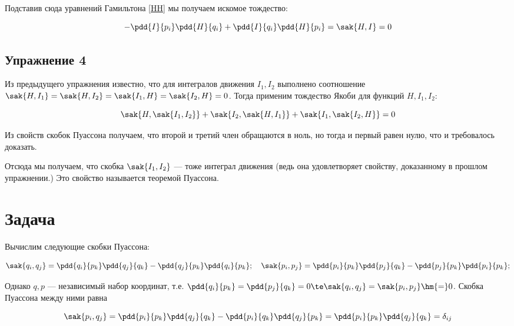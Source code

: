 \documentclass[12pt]{kiarticle}
\begin{document}
	Подставив сюда уравнений Гамильтона \eqref{HH} мы получаем искомое тождество:
	
	\begin{equation}\label{}
	 -\pdd{I}{p_i}\pdd{H}{q_i} + \pdd{I}{q_i}\pdd{H}{p_i} = \sak{H, I} = 0
	\end{equation}
	
	\subsection{Упражнение 4}
	
	Из предыдущего упражнения известно, что для интегралов движения $ I_1, I_2 $ выполнено соотношение $ \sak{H, I_1} =   \sak{H, I_2} = \sak{I_1, H} =\sak{I_2, H} = 0$. Тогда применим тождество Якоби для функций $ H, I_1, I_2 $:
	
	\begin{equation}\label{}
	\sak{H,\sak{I_1, I_2}} + \sak{I_2,\sak{H, I_1}} + \sak{I_1,\sak{I_2, H}} = 0   
	\end{equation}
		
	Из свойств скобок Пуассона получаем, что второй и третий член обращаются в ноль, но тогда и первый равен нулю, что и требовалось доказать. 
	
	Отсюда мы получаем, что скобка $ \sak{I_1, I_2}  $ --- тоже интеграл движения (ведь она удовлетворяет свойству, доказанному в прошлом упражнении.) Это свойство называется теоремой Пуассона.
	
	
	\section{Задача}
	
	Вычислим следующие скобки Пуассона: 
	
	\begin{equation}\label{}
	\sak{q_i, q_j} = \pdd{q_i}{p_k} \pdd{q_j}{q_k} - \pdd{q_j}{p_k}\pdd{q_i}{p_k}; \quad
	 \sak{p_i, p_j} = \pdd{p_i}{p_k} \pdd{p_j}{q_k} - \pdd{p_j}{p_k}\pdd{p_i}{p_k};
	\end{equation}
	
	Однако $ q, p $ --- независимый набор координат, т.е. $ \pdd{q_i}{p_k} =  \pdd{p_j}{q_k} = 0 \te  	\sak{q_i, q_j} =\sak{p_i, p_j} \hm{=} 0$. Скобка Пуассона между ними равна 
	
	\begin{equation}\label{}
	\sak{p_i, q_j} = \pdd{p_i}{p_k}\pdd{q_j}{q_k} - \pdd{p_i}{q_k}\pdd{q_j}{p_k} = \pdd{p_i}{p_k}\pdd{q_j}{q_k}  = \delta_{ij} 
	\end{equation}
	
\end{document}
